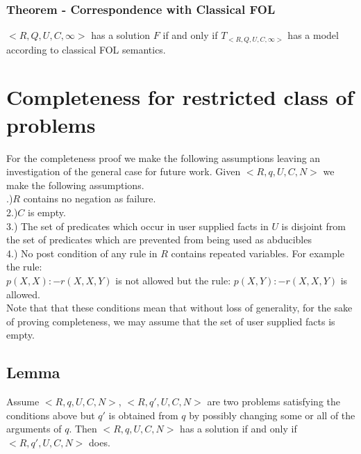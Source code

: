\documentclass{article}
\begin{document}
\subsubsection{Theorem - Correspondence with Classical FOL}
$<R,Q,U,C,\infty>$ has a solution $F$ if and only if $T_{<R,Q,U,C,\infty>}$ has a model according to classical FOL semantics.


\section{Completeness for restricted class of problems}
For the completeness proof we make the following assumptions leaving an investigation of the general case for future work. Given $<R,q,U,C,N>$ we make the following assumptions.\\
.)$R$ contains no negation as failure.\\
2.)$C$ is empty.\\
3.) The set of predicates which occur in user supplied facts in $U$ is disjoint from the set of predicates which are prevented from being used as abducibles\\
4.) No post condition of any rule in $R$ contains repeated variables. For example the rule:\\
$p(X,X):-r(X,X,Y)$ is not allowed but the rule: $p(X,Y):-r(X,X,Y)$ is allowed.\\
\newline
Note that that these conditions mean that without loss of generality, for the sake of proving completeness, we may assume that the set of user supplied facts is empty.

\subsection{Lemma}
Assume $<R,q,U,C,N>$, $<R,q',U,C,N>$ are two problems satisfying the conditions above but $q'$ is obtained from $q$ by possibly changing some or all of the arguments of $q$. Then $<R,q,U,C,N>$ has a solution if and only if $<R,q',U,C,N>$ does.\\
\end{document}
